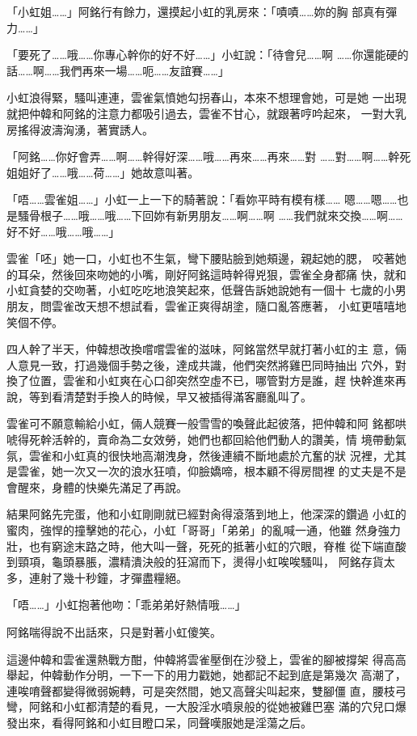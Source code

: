 「小虹姐……」阿銘行有餘力，還摸起小虹的乳房來：「嘖嘖……妳的胸
部真有彈力……」

「要死了……哦……你專心幹你的好不好……」小虹說：「待會兒……啊
……你還能硬的話……啊……我們再來一場……呃……友誼賽……」

小虹浪得緊，騷叫連連，雲雀氣憤她勾拐春山，本來不想理會她，可是她
一出現就把仲韓和阿銘的注意力都吸引過去，雲雀不甘心，就跟著哼吟起來，
一對大乳房搖得波濤洶湧，著實誘人。

「阿銘……你好會弄……啊……幹得好深……哦……再來……再來……對
……對……啊……幹死姐姐好了……哦……荷……」她故意叫著。

「唔……雲雀姐……」小虹一上一下的騎著說：「看妳平時有模有樣……
嗯……嗯……也是騷骨根子……哦……哦……下回妳有新男朋友……啊……啊
……我們就來交換……啊……好不好……哦……哦……」

雲雀「呸」她一口，小虹也不生氣，彎下腰貼臉到她頰邊，親起她的腮，
咬著她的耳朵，然後回來吻她的小嘴，剛好阿銘這時幹得兇狠，雲雀全身都痛
快，就和小虹貪婪的交吻著，小虹吃吃地浪笑起來，低聲告訴她說她有一個十
七歲的小男朋友，問雲雀改天想不想試看，雲雀正爽得胡塗，隨口亂答應著，
小虹更嘻嘻地笑個不停。

四人幹了半天，仲韓想改換嚐嚐雲雀的滋味，阿銘當然早就打著小虹的主
意，倆人意見一致，打過幾個手勢之後，達成共識，他們突然將雞巴同時抽出
穴外，對換了位置，雲雀和小虹爽在心口卻突然空虛不已，哪管對方是誰，趕
快幹進來再說，等到看清楚對手換人的時候，早又被插得滿客廳亂叫了。

雲雀可不願意輸給小虹，倆人競賽一般雪雪的喚聲此起彼落，把仲韓和阿
銘都哄唬得死幹活幹的，賣命為二女效勞，她們也都回給他們動人的讚美，情
境帶動氣氛，雲雀和小虹真的很快地高潮洩身，然後連續不斷地處於亢奮的狀
況裡，尤其是雲雀，她一次又一次的浪水狂噴，仰臉嬌啼，根本顧不得房間裡
的丈夫是不是會醒來，身體的快樂先滿足了再說。

結果阿銘先完蛋，他和小虹剛剛就已經對肏得滾落到地上，他深深的鑽過
小虹的蜜肉，強悍的撞擊她的花心，小虹「哥哥」「弟弟」的亂喊一通，他雖
然身強力壯，也有窮途末路之時，他大叫一聲，死死的抵著小虹的穴眼，脊椎
從下端直酸到頸項，龜頭暴脹，濃精潰決般的狂瀉而下，燙得小虹唉唉騷叫，
阿銘存貨太多，連射了幾十秒鐘，才彈盡糧絕。

「唔……」小虹抱著他吻：「乖弟弟好熱情哦……」

阿銘喘得說不出話來，只是對著小虹傻笑。

這邊仲韓和雲雀還熱戰方酣，仲韓將雲雀壓倒在沙發上，雲雀的腳被撐架
得高高舉起，仲韓動作分明，一下一下的用力戳她，她都記不起到底是第幾次
高潮了，連唉唷聲都變得微弱婉轉，可是突然間，她又高聲尖叫起來，雙腳僵
直，腰枝弓彎，阿銘和小虹都清楚的看見，一大股淫水噴泉般的從她被雞巴塞
滿的穴兒口爆發出來，看得阿銘和小虹目瞪口呆，同聲嘆服她是淫蕩之后。

